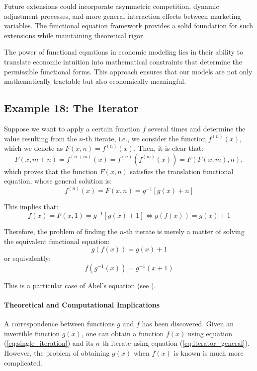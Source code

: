 Future extensions could incorporate asymmetric competition, dynamic adjustment processes, and more general interaction effects between marketing variables. The functional equation framework provides a solid foundation for such extensions while maintaining theoretical rigor.

The power of functional equations in economic modeling lies in their ability to translate economic intuition into mathematical constraints that determine the permissible functional forms. This approach ensures that our models are not only mathematically tractable but also economically meaningful.

\subsection{Example 18: The Iterator}
Suppose we want to apply a certain function $f$ several times and determine the value resulting from the $n$-th iterate, i.e., we consider the function $f^{(n)}(x)$, which we denote as $F(x,n) = f^{(n)}(x)$. Then, it is clear that:
\begin{equation}
F(x, m+n) = f^{(n+m)}(x) = f^{(n)}(f^{(m)}(x)) = F(F(x,m), n),
\end{equation}
which proves that the function $F(x,n)$ satisfies the translation functional equation, whose general solution is:
\begin{equation}
\label{eq:iterator_general}
f^{(n)}(x) = F(x,n) = g^{-1}[g(x) + n]
\end{equation}

This implies that:
\begin{equation}
\label{eq:single_iteration}
f(x) = F(x,1) = g^{-1}[g(x) + 1] \Leftrightarrow g(f(x)) = g(x) + 1
\end{equation}

Therefore, the problem of finding the $n$-th iterate is merely a matter of solving the equivalent functional equation:
\begin{equation}
\label{eq:abel_equation}
g(f(x)) = g(x) + 1
\end{equation}
or equivalently:
\begin{equation}
f(g^{-1}(x)) = g^{-1}(x + 1)
\end{equation}

This is a particular case of Abel's equation (see \cite{KucChoGer:90}).

\paragraph{Theoretical and Computational Implications}
A correspondence between functions $g$ and $f$ has been discovered. Given an invertible function $g(x)$, one can obtain a function $f(x)$ using equation (\ref{eq:single_iteration}) and its $n$-th iterate using equation (\ref{eq:iterator_general}). However, the problem of obtaining $g(x)$ when $f(x)$ is known is much more complicated.

